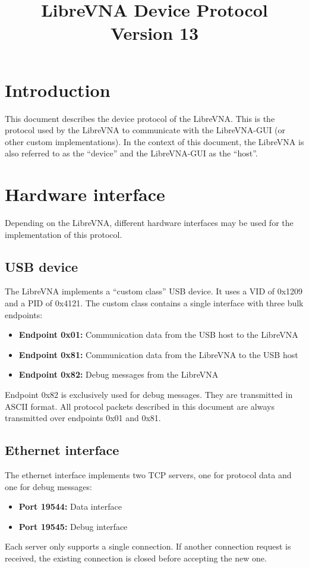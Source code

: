 \documentclass[a4paper,11pt]{article}
\title{LibreVNA Device Protocol\\\small{Version 13}}
\begin{document}
\maketitle
\tableofcontents
\clearpage

\section{Introduction}
This document describes the device protocol of the LibreVNA. This is the protocol used by the LibreVNA to communicate with the LibreVNA-GUI (or other custom implementations). In the context of this document, the LibreVNA is also referred to as the ``device'' and the LibreVNA-GUI as the ``host''.

\section{Hardware interface}
Depending on the LibreVNA, different hardware interfaces may be used for the implementation of this protocol.

\subsection{USB device}
The LibreVNA implements a ``custom class'' USB device. It uses a VID of 0x1209 and a PID of 0x4121. The custom class contains a single interface with three bulk endpoints:
\begin{itemize}
\item \textbf{Endpoint 0x01:} Communication data from the USB host to the LibreVNA
\item \textbf{Endpoint 0x81:} Communication data from the LibreVNA to the USB host
\item \textbf{Endpoint 0x82:} Debug messages from the LibreVNA
\end{itemize}

Endpoint 0x82 is exclusively used for debug messages. They are transmitted in ASCII format. All protocol packets described in this document are always transmitted over endpoints 0x01 and 0x81.

\subsection{Ethernet interface}
The ethernet interface implements two TCP servers, one for protocol data and one for debug messages:
\begin{itemize}
\item \textbf{Port 19544:} Data interface
\item \textbf{Port 19545:} Debug interface
\end{itemize}
Each server only supports a single connection. If another connection request is received, the existing connection is closed before accepting the new one.
\end{document}
